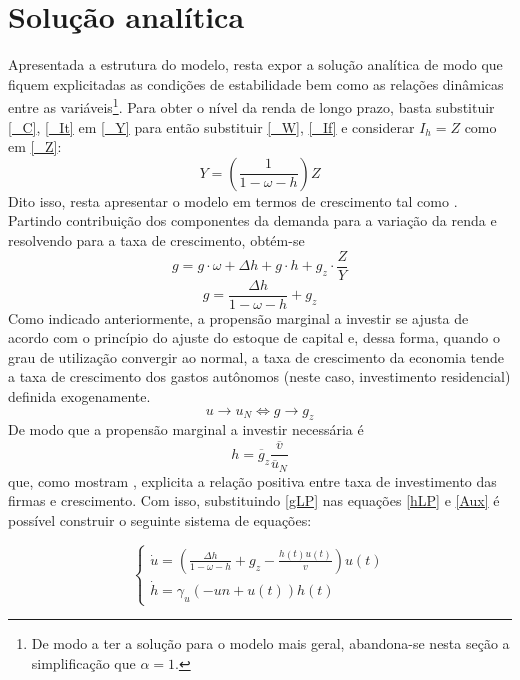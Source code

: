 \section{Solução analítica}
\label{SecAnalitica}

Apresentada a estrutura do modelo, resta expor a solução analítica de modo que fiquem explicitadas as condições de estabilidade bem como as relações dinâmicas entre as variáveis\footnote{De modo a ter a solução para o modelo mais geral, abandona-se nesta seção a simplificação que $\alpha=1$.}. Para obter o nível da renda de longo prazo, basta substituir \ref{_C}, \ref{_It} em \ref{_Y} para então substituir \ref{_W}, \ref{_If} e considerar $I_h = Z$ como em \ref{_Z}:
\begin{equation}
    \label{AnaliticaNivel}
    Y = \left(\frac{1}{1-\omega - h}\right)Z
\end{equation}
Dito isso, resta apresentar o modelo em termos de crescimento tal como \textcite{freitas_growth_2015}. Partindo contribuição dos componentes da demanda para a variação da renda e resolvendo para a taxa de crescimento, obtém-se
$$
g = g\cdot \omega + \Delta h + g\cdot h + g_z\cdot \frac{Z}{Y}
$$
\begin{equation}
\label{gLP}
    g = \frac{\Delta h}{1 - \omega - h} + g_z
\end{equation}
Como indicado anteriormente, a propensão marginal a investir se ajusta de acordo com o princípio do ajuste do estoque de capital e, dessa forma, quando o grau de utilização convergir ao normal, a taxa de crescimento da economia tende a taxa de crescimento dos gastos autônomos (neste caso, investimento residencial) definida exogenamente. 
\begin{equation}
u \to u_N \Leftrightarrow g \to g_z
\end{equation}
De modo que a propensão marginal a investir necessária é
\begin{equation}
\label{hLP}
h = \overline g_z\frac{\overline v}{\overline u_N}
\end{equation}
que, como mostram \textcite{fagundes_role_2017}, explicita a relação positiva entre taxa de investimento das firmas e crescimento. Com isso, substituindo \ref{gLP} nas equações \ref{hLP} e \ref{Aux} é possível construir o seguinte sistema de equações:

$$
\begin{cases}
\dot u = \left(\frac{\Delta h}{1 - \omega - h} + g_z - \frac{h{\left(t \right)} u{\left(t \right)}}{v}\right) u{\left(t \right)}\\
\dot h = \gamma_{u} \left(- un + u{\left(t \right)}\right) h{\left(t \right)}
\end{cases}
$$

